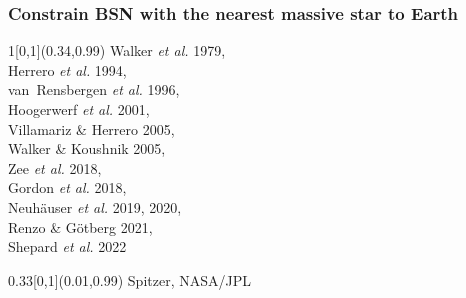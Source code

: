 \documentclass[xcolor=dvipsnames,professionalfonts, aspectratio=169]{beamer}
\begin{document}
\bgroup
{}
\begin{frame}
  \frametitle{\textcolor{whiteish}{Constrain BSN with the nearest massive star to
      Earth}}

  \begin{textblock}{1}[0,1](0.34,0.99)
    \textcolor{gray!50}{\tiny
      Walker \emph{et al.} 1979,\\
      Herrero \emph{et al.} 1994,\\
      van~Rensbergen \emph{et al.} 1996,\\
      Hoogerwerf \emph{et al.} 2001,\\
      Villamariz \& Herrero 2005,\\
      Walker \& Koushnik 2005,\\
      Zee \emph{et al.} 2018,\\
      Gordon \emph{et al.} 2018,\\
      Neuh\"auser \emph{et al.} 2019, 2020,\\
      Renzo \& G\"otberg 2021,\\[-7pt]
      Shepard \emph{et al.} 2022
    }
  \end{textblock}

  \begin{textblock}{0.33}[0,1](0.01,0.99)
    \textcolor{gray!50}{\tiny Spitzer, NASA/JPL}
  \end{textblock}






\end{frame}
\end{document}
